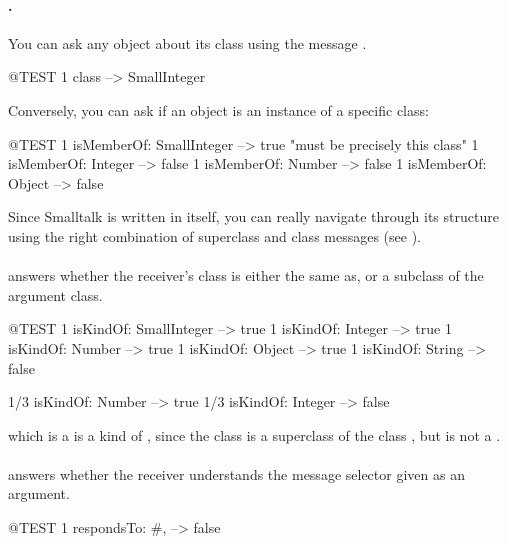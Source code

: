 \documentclass[a4paper,10pt,twoside]{book}
\begin{document}
\paragraph{.}
You can ask any object about its class using the message .
\begin{code}{@TEST}
1 class --> SmallInteger
\end{code}

Conversely, you can ask if an object is an instance of a specific class:
\begin{code}{@TEST}
1 isMemberOf: SmallInteger --> true    "must be precisely this class"
1 isMemberOf: Integer          --> false
1 isMemberOf: Number        --> false
1 isMemberOf: Object           --> false
\end{code}

Since Smalltalk is written in itself, you can really navigate through its structure using the right combination of superclass and class messages (see ). 

\paragraph{}
 answers whether the receiver's class is either the same as, or a subclass of the argument class.

\begin{code}{@TEST}
1 isKindOf: SmallInteger --> true
1 isKindOf: Integer          --> true
1 isKindOf: Number         --> true
1 isKindOf: Object           --> true
1 isKindOf: String            --> false

1/3 isKindOf: Number      --> true
1/3 isKindOf: Integer        --> false
\end{code}

 which is a  is a kind of , since the class  is a superclass of the class , but  is not a .

\paragraph{}
 answers whether the receiver understands the message selector given as an argument.

\begin{code}{@TEST}
1 respondsTo: #, --> false
\end{code}
\end{document}
